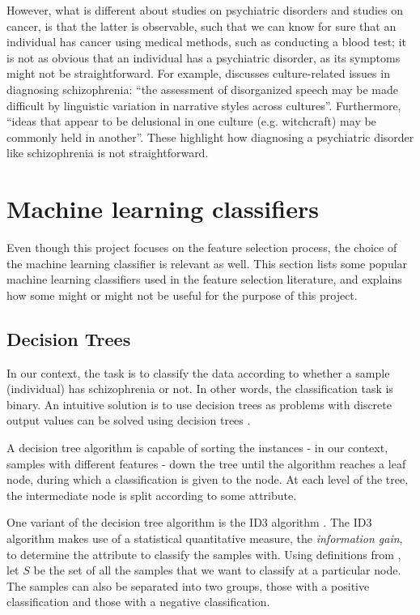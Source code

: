 \documentclass[12pt, twoside, a4paper]{report}
\begin{document}
However, what is different about studies on psychiatric disorders and studies on cancer, is that the latter is observable, such that we can know for sure that an individual has cancer using medical methods, such as conducting a blood test; it is not as obvious that an individual has a psychiatric disorder, as its symptoms might not be straightforward. For example, \cite{RefWorks:114} discusses culture-related issues in diagnosing schizophrenia: ``the assessment of disorganized speech may be made difficult by linguistic variation in narrative styles across cultures''. Furthermore, ``ideas that appear to be delusional in one culture (e.g. witchcraft) may be commonly held in another''. These highlight how diagnosing a psychiatric disorder like schizophrenia is not straightforward.


\section{Machine learning classifiers} \label{bg_ML}
Even though this project focuses on the feature selection process, the choice of the machine learning classifier is relevant as well. This section lists some popular machine learning classifiers used in the feature selection literature, and explains how some might or might not be useful for the purpose of this project.

\subsection{Decision Trees} \label{bg:ml:decisionTree}
In our context, the task is to classify the data according to whether a sample (individual) has schizophrenia or not. In other words, the classification task is binary. An intuitive solution is to use decision trees as problems with discrete output values can be solved using decision trees \cite{RefWorks:98}.

A decision tree algorithm is capable of sorting the  instances - in our context, samples with different features - down the tree until the algorithm reaches a leaf node, during which a classification is given to the node. At each level of the tree, the intermediate node is split according to some attribute.

One variant of the decision tree algorithm is the ID3 algorithm \cite{RefWorks:99}. The ID3 algorithm makes use of a statistical quantitative measure, the \textit{information gain}, to determine the attribute to classify the samples with. Using definitions from \cite{RefWorks:98}, let $S$ be the set of all the samples that we want to classify at a particular node. The samples can also be separated into two groups, those with a positive classification and those with a negative classification.\\
\end{document}
